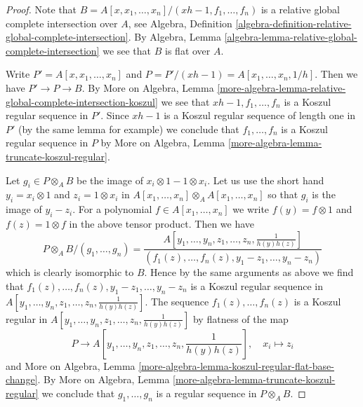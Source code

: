 \documentclass[10pt,a4paper]{amsart}
\theoremstyle{plain}
\theoremstyle{definition}
\theoremstyle{remark}
\numberwithin{equation}{subsection}
\begin{document}
\begin{proof}
Note that
$B = A[x, x_1, \ldots, x_n]/(xh - 1, f_1, \ldots, f_n)$
is a relative global complete intersection over $A$, see
Algebra, Definition
\ref{algebra-definition-relative-global-complete-intersection}.
By Algebra, Lemma \ref{algebra-lemma-relative-global-complete-intersection}
we see that $B$ is flat over $A$.

\medskip\noindent
Write $P' = A[x, x_1, \ldots, x_n]$ and
$P = P'/(xh - 1) = A[x_1, \ldots, x_n, 1/h]$.
Then we have $P' \to P \to B$.
By More on Algebra, Lemma
\ref{more-algebra-lemma-relative-global-complete-intersection-koszul}
we see that $xh - 1, f_1, \ldots, f_n$ is a Koszul regular sequence
in $P'$. Since $xh - 1$ is a Koszul regular sequence of length
one in $P'$ (by the same lemma for example) we conclude that 
$f_1, \ldots, f_n$ is a Koszul regular sequence in $P$ by
More on Algebra, Lemma \ref{more-algebra-lemma-truncate-koszul-regular}.

\medskip\noindent
Let $g_i \in P \otimes_A B$ be the image of $x_i \otimes 1 - 1 \otimes x_i$.
Let us use the short hand $y_i = x_i \otimes 1$ and $z_i = 1 \otimes x_i$
in $A[x_1, \ldots, x_n] \otimes_A A[x_1, \ldots, x_n]$
so that $g_i$ is the image of $y_i - z_i$. For a polynomial
$f \in A[x_1, \ldots, x_n]$ we write $f(y) = f \otimes 1$
and $f(z) = 1 \otimes f$ in the above tensor product.
Then we have
$$
P \otimes_A B/(g_1, \ldots, g_n) =
\frac{A[y_1, \ldots, y_n, z_1, \ldots, z_n, \frac{1}{h(y)h(z)}]}
{(f_1(z), \ldots, f_n(z), y_1 - z_1, \ldots, y_n - z_n)}
$$
which is clearly isomorphic to $B$. Hence by the same arguments
as above we find that $f_1(z), \ldots, f_n(z), y_1 - z_1, \ldots, y_n - z_n$
is a Koszul regular sequence in
$A[y_1, \ldots, y_n, z_1, \ldots, z_n, \frac{1}{h(y)h(z)}]$.
The sequence $f_1(z), \ldots, f_n(z)$ is a Koszul regular in
$A[y_1, \ldots, y_n, z_1, \ldots, z_n, \frac{1}{h(y)h(z)}]$
by flatness of the map
$$
P \longrightarrow A[y_1, \ldots, y_n, z_1, \ldots, z_n,
\textstyle{\frac{1}{h(y)h(z)}}],\quad x_i \longmapsto z_i
$$
and More on Algebra, Lemma
\ref{more-algebra-lemma-koszul-regular-flat-base-change}.
By More on Algebra, Lemma \ref{more-algebra-lemma-truncate-koszul-regular}
we conclude that $g_1, \ldots, g_n$ is a regular sequence
in $P \otimes_A B$.


\end{proof}
\end{document}
